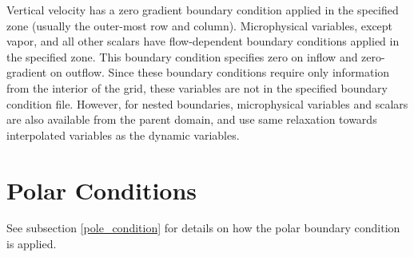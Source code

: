 Vertical velocity has a zero gradient boundary condition applied in the
specified zone (usually the outer-most row and column).
Microphysical variables, except vapor, and all other scalars have flow-dependent boundary
conditions applied in the specified zone. This boundary condition specifies zero on inflow
and zero-gradient on outflow. Since these boundary conditions require only information from
the interior of the grid, these variables are not in the specified boundary condition file.
However, for nested boundaries, microphysical variables and scalars are also available
from the parent domain, and use same relaxation towards interpolated variables as the
dynamic variables.

\section{Polar Conditions}
See subsection \ref{pole_condition} for details on how the polar boundary
condition is applied.
